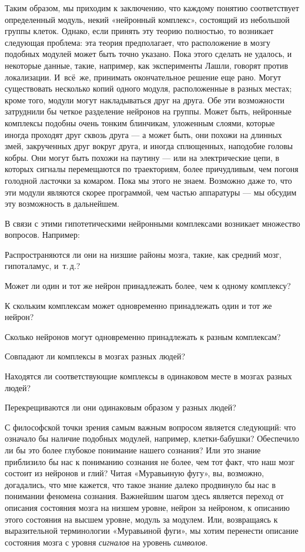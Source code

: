 \documentclass[../main.tex]{subfiles}
\begin{document}
Таким образом, мы приходим к заключению, что каждому понятию соответствует определенный модуль, некий «нейронный комплекс», состоящий из небольшой группы клеток. Однако, если принять эту теорию полностью, то возникает следующая проблема: эта теория предполагает, что расположение в мозгу подобных модулей может быть точно указано. Пока этого сделать не удалось, и некоторые данные, такие, например, как эксперименты Лашли, говорят против локализации. И~всё~же, принимать окончательное решение еще рано. Могут существовать несколько копий одного модуля, расположенные в разных местах; кроме того, модули могут накладываться друг на друга. Обе эти возможности затруднили бы четкое разделение нейронов на группы. Может быть, нейронные комплексы подобны очень тонким блинчикам, уложенным слоями, которые иногда проходят друг сквозь друга --- а может быть, они похожи на длинных змей, закрученных друг вокруг друга, и иногда сплющенных, наподобие головы кобры. Они могут быть похожи на паутину --- или на электрические цепи, в которых сигналы перемещаются по траекториям, более причудливым, чем погоня голодной ласточки за комаром. Пока мы этого не знаем. Возможно даже то, что эти модули являются скорее программой, чем частью аппаратуры --- мы обсудим эту возможность в дальнейшем.

В связи с этими гипотетическими нейронными комплексами возникает множество вопросов. Например:

Распространяются ли они на низшие районы мозга, такие, как средний мозг, гипоталамус, и~т.\,д.?

Может ли один и тот же нейрон принадлежать более, чем к одному комплексу?

К скольким комплексам может одновременно принадлежать один и тот же нейрон?

Сколько нейронов могут одновременно принадлежать к разным комплексам?

Совпадают ли комплексы в мозгах разных людей?

Находятся ли соответствующие комплексы в одинаковом месте в мозгах разных людей?

Перекрещиваются ли они одинаковым образом у разных людей?

С философской точки зрения самым важным вопросом является следующий: что означало бы наличие подобных модулей, например, клетки-бабушки? Обеспечило ли бы это более глубокое понимание нашего сознания? Или это знание приблизило бы нас к пониманию сознания не более, чем тот факт, что наш мозг состоит из нейронов и глий? Читая «Муравьиную фугу», вы, возможно, догадались, что мне кажется, что такое знание далеко продвинуло бы нас в понимании феномена сознания. Важнейшим шагом здесь является переход от описания состояния мозга на низшем уровне, нейрон за нейроном, к описанию этого состояния на высшем уровне, модуль за модулем. Или, возвращаясь к выразительной терминологии «Муравьиной фуги», мы хотим перенести описание состояния мозга с уровня \emph{сигналов} на уровень \emph{символов}.
\end{document}
